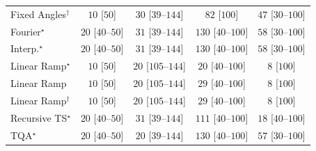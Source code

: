 \begin{tabular}{l|cccc|}
Fixed Angles$^\dagger$ & {\cellcolor[HTML]{F7FCF5}} \color[HTML]{000000} $10$ [$50$] & {\cellcolor[HTML]{F3FAF0}} \color[HTML]{000000} $30$ [$39$--$144$] & {\cellcolor[HTML]{EAF7E6}} \color[HTML]{000000} $82$ [$100$] & {\cellcolor[HTML]{F0F9ED}} \color[HTML]{000000} $47$ [$30$--$100$] \\
Fourier$^\star$ & {\cellcolor[HTML]{F5FBF2}} \color[HTML]{000000} $20$ [$40$--$50$] & {\cellcolor[HTML]{F3FAF0}} \color[HTML]{000000} $31$ [$39$--$144$] & {\cellcolor[HTML]{DFF3DA}} \color[HTML]{000000} $130$ [$40$--$100$] & {\cellcolor[HTML]{EFF9EB}} \color[HTML]{000000} $58$ [$30$--$100$] \\
Interp.$^\star$ & {\cellcolor[HTML]{F5FBF2}} \color[HTML]{000000} $20$ [$40$--$50$] & {\cellcolor[HTML]{F3FAF0}} \color[HTML]{000000} $31$ [$39$--$144$] & {\cellcolor[HTML]{DFF3DA}} \color[HTML]{000000} $130$ [$40$--$100$] & {\cellcolor[HTML]{EFF9EB}} \color[HTML]{000000} $58$ [$30$--$100$] \\
Linear Ramp$^\star$ & {\cellcolor[HTML]{F7FCF5}} \color[HTML]{000000} $10$ [$50$] & {\cellcolor[HTML]{F5FBF2}} \color[HTML]{000000} $20$ [$105$--$144$] & {\cellcolor[HTML]{F5FBF2}} \color[HTML]{000000} $20$ [$40$--$100$] & {\cellcolor[HTML]{F7FCF5}} \color[HTML]{000000} $8$ [$100$] \\
Linear Ramp & {\cellcolor[HTML]{F7FCF5}} \color[HTML]{000000} $10$ [$50$] & {\cellcolor[HTML]{F5FBF2}} \color[HTML]{000000} $20$ [$105$--$144$] & {\cellcolor[HTML]{F4FBF1}} \color[HTML]{000000} $29$ [$40$--$100$] & {\cellcolor[HTML]{F7FCF5}} \color[HTML]{000000} $8$ [$100$] \\
Linear Ramp$^\dagger$ & {\cellcolor[HTML]{F7FCF5}} \color[HTML]{000000} $10$ [$50$] & {\cellcolor[HTML]{F5FBF2}} \color[HTML]{000000} $20$ [$105$--$144$] & {\cellcolor[HTML]{F4FBF1}} \color[HTML]{000000} $29$ [$40$--$100$] & {\cellcolor[HTML]{F7FCF5}} \color[HTML]{000000} $8$ [$100$] \\
Recursive TS$^\star$ & {\cellcolor[HTML]{F5FBF2}} \color[HTML]{000000} $20$ [$40$--$50$] & {\cellcolor[HTML]{F3FAF0}} \color[HTML]{000000} $31$ [$39$--$144$] & {\cellcolor[HTML]{E5F5E0}} \color[HTML]{000000} $111$ [$40$--$100$] & {\cellcolor[HTML]{F5FBF3}} \color[HTML]{000000} $18$ [$40$--$100$] \\
TQA$^\star$ & {\cellcolor[HTML]{F5FBF2}} \color[HTML]{000000} $20$ [$40$--$50$] & {\cellcolor[HTML]{F5FBF2}} \color[HTML]{000000} $20$ [$39$--$144$] & {\cellcolor[HTML]{DFF3DA}} \color[HTML]{000000} $130$ [$40$--$100$] & {\cellcolor[HTML]{EFF9EB}} \color[HTML]{000000} $57$ [$30$--$100$] \\

\end{tabular}
